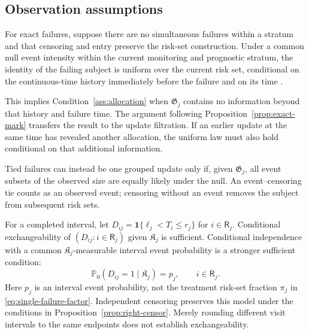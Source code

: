 \documentclass[12pt]{article}
\theoremstyle{definition}
\theoremstyle{remark}
\begin{document}
\subsection{Observation assumptions}
\label{sec:observation-mechanisms}

For exact failures, suppose there are no simultaneous failures within a stratum and that censoring and entry preserve the risk-set construction. Under a common null event intensity within the current monitoring and prognostic stratum, the identity of the failing subject is uniform over the current risk set, conditional on the continuous-time history immediately before the failure and on its time \citep{AndersenEtAl1993,FlemingHarrington1991}.

This implies Condition~\ref{ass:allocation} when $\mathfrak G_j$ contains no information beyond that history and failure time. The argument following Proposition~\ref{prop:exact-mark} transfers the result to the update filtration. If an earlier update at the same time has revealed another allocation, the uniform law must also hold conditional on that additional information.

Tied failures can instead be one grouped update only if, given $\mathfrak G_j$, all event subsets of the observed size are equally likely under the null. An event--censoring tie counts as an observed event; censoring without an event removes the subject from subsequent risk sets.

For a completed interval, let $D_{ij}=\mathbf 1\{\ell_j<T_i\leq r_j\}$ for $i\in\mathsf R_j$. Conditional exchangeability of $(D_{ij}:i\in\mathsf R_j)$ given $\mathfrak K_j$ is sufficient. Conditional independence with a common $\mathfrak K_j$-measurable interval event probability is a stronger sufficient condition:
\begin{equation}
 \mathbb P_0(D_{ij}=1\mid\mathfrak K_j)=p_j,
 \qquad i\in\mathsf R_j.
 \label{eq:common-panel-prob}
\end{equation}
Here $p_j$ is an interval event probability, not the treatment risk-set fraction $\pi_j$ in \eqref{eq:single-failure-factor}. Independent censoring preserves this model under the conditions in Proposition~\ref{prop:right-censor}. Merely rounding different visit intervals to the same endpoints does not establish exchangeability.
\end{document}
